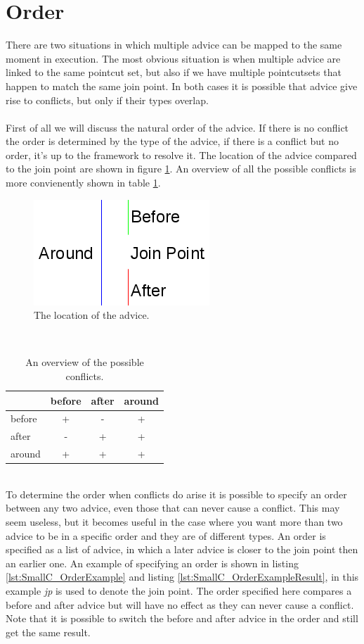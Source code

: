 \documentclass[a4paper]{report}
\begin{document}
\section{Order}
There are two situations in which multiple advice can be mapped to the same moment in execution. The most obvious situation is when multiple advice are linked to the same pointcut set, but also if we have multiple pointcutsets that happen to match the same join point. In both cases it is possible that advice give rise to conflicts, but only if their types overlap.\\
\\
First of all we will discuss the natural order of the advice. If there is no conflict the order is determined by the type of the advice, if there is a conflict but no order, it's up to the framework to resolve it. The location of the advice compared to the join point are shown in figure \ref{fig:COrder}. An overview of all the possible conflicts is more convienently shown in table \ref{tab:SmallC_Conflicts}.
\begin{figure}
\centering
\includegraphics[scale=0.7]{images/AOFC/Order.png}
\caption{The location of the advice.}
\label{fig:COrder}
\end{figure}\\
\begin{table}
\centering
\begin{tabular}{l|c|c|c|}
& before & after & around\\
\hline
before & + & - & + \\
\hline
after & - & + & + \\
\hline
around & + & + & +\\
\hline
\end{tabular}
\caption{An overview of the possible conflicts.}
\label{tab:SmallC_Conflicts}
\end{table}\\
To determine the order when conflicts do arise it is possible to specify an order between any two advice, even those that can never cause a conflict. This may seem useless, but it becomes useful in the case where you want more than two advice to be in a specific order and they are of different types. An order is specified as a list of advice, in which a later advice is closer to the join point then an earlier one. An example of specifying an order is shown in listing \ref{lst:SmallC_OrderExample} and listing \ref{lst:SmallC_OrderExampleResult}, in this example \textit{jp} is used to denote the join point. The order specified here compares a before and after advice but will have no effect as they can never cause a conflict. Note that it is possible to switch the before and after advice in the order and still get the same result.\\
\end{document}
